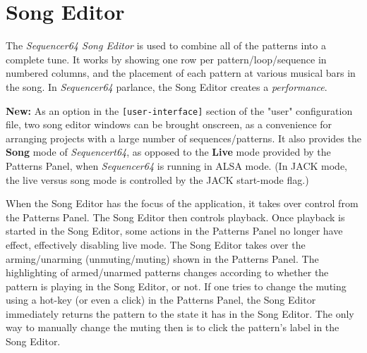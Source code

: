 %
%
%

\section{Song Editor}
\label{sec:seq64_song_editor}

   The \textsl{Sequencer64 Song Editor} is used to combine all of the patterns
   into a complete tune.  It works by showing one row per
   pattern/loop/sequence in numbered columns, and the placement of each
   pattern at various musical bars in the song.
   In \textsl{Sequencer64} parlance, the Song Editor creates a
   \textsl{performance}.

   \textbf{New:}
   As an option in the \texttt{[user-interface]}
   section of the "user" configuration file, two song editor windows can be
   brought onscreen, as a convenience for arranging projects with a large
   number of sequences/patterns.
   It also provides the \textbf{Song} mode of \textsl{Sequencert64},
   as opposed to the \textbf{Live} mode provided by the Patterns Panel, when
   \textsl{Sequencer64} is running in ALSA mode.
   (In JACK mode, the live versus song mode is controlled by the JACK
   start-mode flag.)

   When the Song Editor has the focus of the application, it
   takes over control from the Patterns Panel.  The Song Editor then
   controls playback.  Once playback is started in the Song Editor, some actions
   in the Patterns Panel no longer have effect, effectively disabling live
   mode.  The Song Editor takes over the arming/unarming (unmuting/muting)
   shown in the Patterns Panel.  The highlighting of armed/unarmed patterns
   changes according to whether the pattern is playing in the Song Editor, or
   not.  If one tries to change the muting using a hot-key (or even a click) in
   the Patterns Panel, the Song Editor immediately returns the pattern to the
   state it has in the Song Editor.  The only way to manually change the muting
   then is to click the pattern's label in the Song Editor.
   
